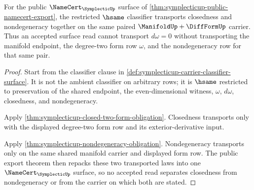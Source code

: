 \begin{theorem}
\label{thm:symplecticup-closed-nondegenerate-public-stability}
For the public $\NameCert_{\SymplecticUp}$ surface of \autoref{thm:symplecticup-public-namecert-export}, the restricted $\hsame$ classifier transports closedness and nondegeneracy together on the same paired $\ManifoldUp+\DiffFormUp$ carrier. Thus an accepted surface read cannot transport $d\omega=0$ without transporting the manifold endpoint, the degree-two form row $\omega$, and the nondegeneracy row for that same pair.
\end{theorem}
\begin{proof}
Start from the classifier clause in \autoref{def:symplecticup-carrier-classifier-surface}. It is not the ambient classifier on arbitrary rows; it is $\hsame$ restricted to preservation of the shared endpoint, the even-dimensional witness, $\omega$, $d\omega$, closedness, and nondegeneracy.

Apply \autoref{thm:symplecticup-closed-two-form-obligation}. Closedness transports only with the displayed degree-two form row and its exterior-derivative input.

Apply \autoref{thm:symplecticup-nondegeneracy-obligation}. Nondegeneracy transports only on the same shared manifold carrier and displayed form row. The public export theorem then repacks these two transported laws into one $\NameCert_{\SymplecticUp}$ surface, so no accepted read separates closedness from nondegeneracy or from the carrier on which both are stated.
\end{proof}

